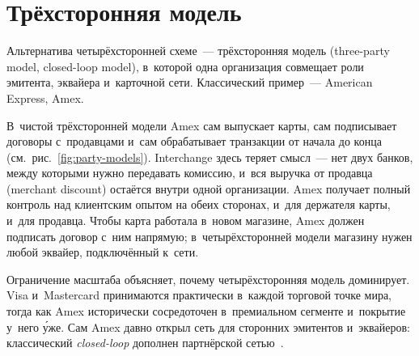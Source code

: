 \section{Трёхсторонняя модель}\label{sec:ecosystem-three-party}

Альтернатива четырёхсторонней схеме~--- трёхсторонняя модель (three-party
model, closed-loop model), в~которой одна организация совмещает роли эмитента,
эквайера и~карточной сети. Классический пример~--- American Express, Amex.

В~чистой трёхсторонней модели Amex сам выпускает карты, сам подписывает
договоры с~продавцами и~сам обрабатывает транзакции от начала до конца
(см.~рис.~\ref{fig:party-models}). Interchange здесь теряет смысл~--- нет двух
банков, между которыми нужно передавать комиссию, и~вся выручка от продавца
(merchant discount) остаётся внутри одной организации. Amex получает полный
контроль над клиентским опытом на обеих сторонах, и~для держателя карты, и~для
продавца. Чтобы карта работала в~новом магазине, Amex должен подписать договор
с~ним напрямую; в~четырёхсторонней модели магазину нужен любой эквайер,
подключённый к~сети.

Ограничение масштаба объясняет, почему четырёхсторонняя модель доминирует. Visa
и~Mastercard принимаются практически в~каждой торговой точке мира, тогда как
Amex исторически сосредоточен в~премиальном сегменте и~покрытие у~него \'{у}же.
Сам Amex давно открыл сеть для сторонних эмитентов и~эквайеров: классический
\textit{closed-loop} дополнен партнёрской сетью~\cite{amex-network}.

